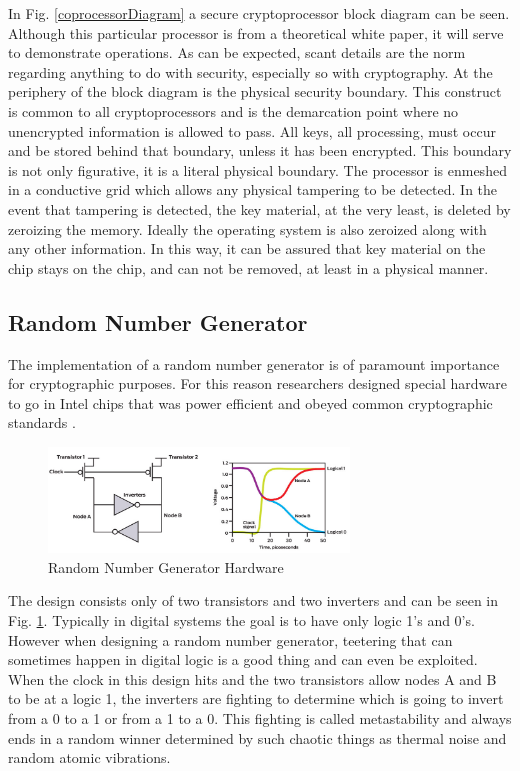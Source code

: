 \documentclass[journal]{IEEEtran}
\begin{document}
In Fig. \ref{coprocessorDiagram} a secure cryptoprocessor block diagram can be seen.  Although this particular processor is from a theoretical white paper, it will serve to demonstrate operations.  As can be expected, scant details are the norm regarding anything to do with security, especially so with cryptography.  At the periphery of the block diagram is the physical security boundary.  This construct is common to all cryptoprocessors and is the demarcation point where no unencrypted information is allowed to pass.  All keys, all processing, must occur and be stored behind that boundary, unless it has been encrypted.  This boundary is not only figurative, it is a literal physical boundary.  The processor is enmeshed in a conductive grid \cite{coprocesserWhitePaper} which allows any physical tampering to be detected.  In the event that tampering is detected, the key material, at the very least, is deleted by zeroizing the memory.  Ideally the operating system is also zeroized along with any other information.  In this way, it can be assured that key material on the chip stays on the chip, and can not be removed, at least in a physical manner.

\subsection{Random Number Generator}

The implementation of a random number generator is of paramount importance for cryptographic purposes.  For this reason researchers designed special hardware to go in Intel chips that was power efficient and obeyed common cryptographic standards \cite{IEEERNG}.

\begin{figure}[htbp]
	\centering
	\includegraphics[width=8cm,keepaspectratio]{img/transistorRNG.png}
	\caption{Random Number Generator Hardware \cite{IEEERNG} }
	\label{transistorFig}
\end{figure}

The design consists only of two transistors and two inverters and can be seen in Fig. \ref{transistorFig}.  Typically in digital systems the goal is to have only logic 1's and 0's.  However when designing a random number generator, teetering that can sometimes happen in digital logic is a good thing and can even be exploited.  When the clock in this design hits and the two transistors allow nodes A and B to be at a logic 1, the inverters are fighting to determine which is going to invert from a 0 to a 1 or from a 1 to a 0.  This fighting is called metastability and always ends in a random winner determined by such chaotic things as thermal noise and random atomic vibrations.
\end{document}
